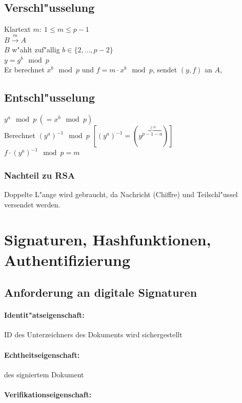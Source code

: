 \subsection{Verschl"usselung}
Klartext $m:\ 1 \leq m \leq p-1$\\
$B \xrightarrow{m} A$ \\
$B$ w"ahlt zuf"allig $b \in \{2,\ldots,p-2\}$\\
$y=g^b \mod{p}$\\
Er berechnet $x^b \mod{p}$ und $f=m\cdot x^b \mod{p}$, sendet $(y,f)$ an $A$,

\subsection{Entschl"usselung}
$y^a \mod{p}\ (= x^b \mod{p})$\\
Berechnet $(y^a)^{-1} \mod{p}$ $[(y^a)^{-1}=(y^{\overbrace{p-1-a}^{\geq 0}})]$\\
$f\cdot (y^a)^{-1} \mod{p}=m$

\subsubsection{Nachteil zu RSA}
Doppelte L"ange wird gebraucht, da Nachricht (Chiffre) und Teilschl"ussel versendet werden.


\section{Signaturen, Hashfunktionen, Authentifizierung}

\subsection{Anforderung an digitale Signaturen}

\paragraph{Identit"atseigenschaft:}

ID des Unterzeichners des Dokuments wird sichergestellt
\paragraph{Echtheitseigenschaft:}

des signiertem Dokument

\paragraph{Verifikationseigenschaft:}

